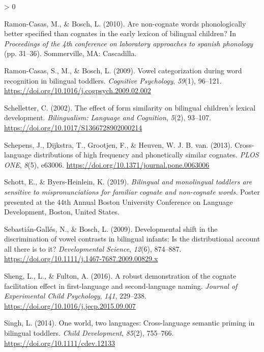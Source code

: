 \documentclass[
  english,
  ,man,floatsintext]{apa6}
\newlength{\cslhangindent}
\newenvironment{CSLReferences}[2] %
 {%
  \setlength{\parindent}{0pt}
  \ifodd #1 \everypar{\setlength{\hangindent}{\cslhangindent}}\ignorespaces\fi
  \ifnum #2 > 0
  \setlength{\parskip}{#2\baselineskip}
  \fi
 }%
 {}
\begin{document}
\begin{CSLReferences}{1}{0}
\leavevmode\hypertarget{ref-Ramon-Casas_Bosch_2010}{}%
Ramon-Casas, M., \& Bosch, L. (2010). Are non-cognate words phonologically better specified than cognates in the early lexicon of bilingual children? In \emph{Proceedings of the 4th conference on laboratory approaches to spanish phonology} (pp. 31--36). Sommerville, MA: Cascadilla.

\leavevmode\hypertarget{ref-Ramon-Casas_etal_2009}{}%
Ramon-Casas, S., M., \& Bosch, L. (2009). Vowel categorization during word recognition in bilingual toddlers. \emph{Cognitive Psychology}, \emph{59}(1), 96--121. \url{https://doi.org/10.1016/j.cogpsych.2009.02.002}

\leavevmode\hypertarget{ref-Schelletter_2002}{}%
Schelletter, C. (2002). The effect of form similarity on bilingual children's lexical development. \emph{Bilingualism: Language and Cognition}, \emph{5}(2), 93--107. \url{https://doi.org/10.1017/S1366728902000214}

\leavevmode\hypertarget{ref-Schepens_etal_2013}{}%
Schepens, J., Dijkstra, T., Grootjen, F., \& Heuven, W. J. B. van. (2013). Cross-language distributions of high frequency and phonetically similar cognates. \emph{PLOS ONE}, \emph{8}(5), e63006. \url{https://doi.org/10.1371/journal.pone.0063006}

\leavevmode\hypertarget{ref-Schott_Byers-Heinlein_2019}{}%
Schott, E., \& Byers-Heinlein, K. (2019). \emph{Bilingual and monolingual toddlers are sensitive to mispronunciations for familiar cognate and non-cognate words.} Poster presented at the 44th Annual Boston University Conference on Language Development, Boston, United States.

\leavevmode\hypertarget{ref-Sebastiuxe1n-Galluxe9s_Bosch_2009}{}%
Sebastián-Gallés, N., \& Bosch, L. (2009). Developmental shift in the discrimination of vowel contrasts in bilingual infants: Is the distributional account all there is to it? \emph{Developmental Science}, \emph{12}(6), 874--887. \url{https://doi.org/10.1111/j.1467-7687.2009.00829.x}

\leavevmode\hypertarget{ref-Sheng_etal_2016}{}%
Sheng, L., L., \& Fulton, A. (2016). A robust demonstration of the cognate facilitation effect in first-language and second-language naming. \emph{Journal of Experimental Child Psychology}, \emph{141}, 229--238. \url{https://doi.org/10.1016/j.jecp.2015.09.007}

\leavevmode\hypertarget{ref-Singh_2014}{}%
Singh, L. (2014). One world, two languages: Cross-language semantic priming in bilingual toddlers. \emph{Child Development}, \emph{85}(2), 755--766. \url{https://doi.org/10.1111/cdev.12133}


\end{CSLReferences}
\end{document}
